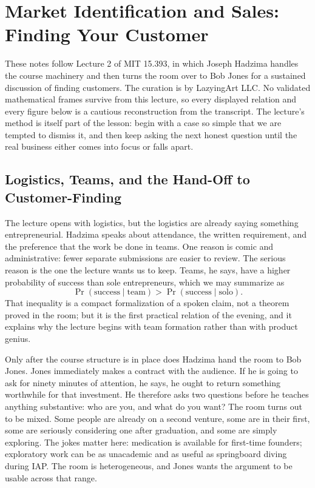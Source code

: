 \chapter{Market Identification and Sales: Finding Your Customer}

These notes follow Lecture 2 of MIT 15.393, in which Joseph Hadzima handles the course machinery and then turns the room over to Bob Jones for a sustained discussion of finding customers. The curation is by LazyingArt LLC. No validated mathematical frames survive from this lecture, so every displayed relation and every figure below is a cautious reconstruction from the transcript. The lecture's method is itself part of the lesson: begin with a case so simple that we are tempted to dismiss it, and then keep asking the next honest question until the real business either comes into focus or falls apart.

\section{Logistics, Teams, and the Hand-Off to Customer-Finding}

The lecture opens with logistics, but the logistics are already saying something entrepreneurial. Hadzima speaks about attendance, the written requirement, and the preference that the work be done in teams. One reason is comic and administrative: fewer separate submissions are easier to review. The serious reason is the one the lecture wants us to keep. Teams, he says, have a higher probability of success than sole entrepreneurs, which we may summarize as
\begin{equation}
\Pr(\text{success}\mid \text{team})>\Pr(\text{success}\mid \text{solo}).
\end{equation}
That inequality is a compact formalization of a spoken claim, not a theorem proved in the room; but it is the first practical relation of the evening, and it explains why the lecture begins with team formation rather than with product genius.

Only after the course structure is in place does Hadzima hand the room to Bob Jones. Jones immediately makes a contract with the audience. If he is going to ask for ninety minutes of attention, he says, he ought to return something worthwhile for that investment. He therefore asks two questions before he teaches anything substantive: who are you, and what do you want? The room turns out to be mixed. Some people are already on a second venture, some are in their first, some are seriously considering one after graduation, and some are simply exploring. The jokes matter here: medication is available for first-time founders; exploratory work can be as unacademic and as useful as springboard diving during IAP. The room is heterogeneous, and Jones wants the argument to be usable across that range.

